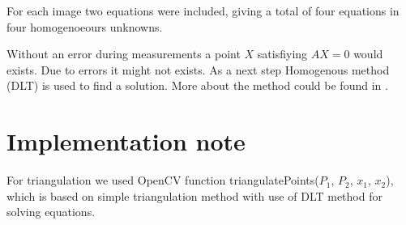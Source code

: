 For each image two equations were included, giving a total of four equations in
four homogenoeours unknowns.

Without an error during measurements a point $X$ satisfiying $AX = 0$ would
exists. Due to errors it might not exists. As a next step Homogenous method
(DLT) is used to find a solution. More about the method could be found in \citet*{multiple-view-geometry}.

\section{Implementation note}
For triangulation we used OpenCV function triangulatePoints($P_1$, $P_2$,
$x_1$, $x_2$), which is based on simple triangulation method with use of DLT
method for solving equations.
